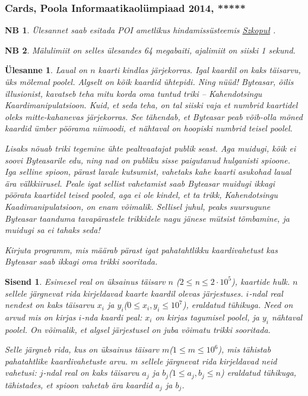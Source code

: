 \documentclass{trkut}
\newtheorem*{extra}{NB}
\newtheorem*{Input}{Sisend}
\newtheorem*{Text}{Ülesanne}
\begin{document}
\subsubsection{Cards, Poola Informaatikaolümpiaad 2014, *****}
\begin{extra}
Ülesannet saab esitada POI ametlikus hindamissüsteemis \href{https://szkopul.edu.pl/problemset/problem/qpsk3ygf8MU7D_1Es0oc_xd8/site/?key=statement}{Szkopuł} .
\end{extra}
\begin{extra}
Mälulimiit on selles ülesandes 64 megabaiti, ajalimiit on siiski 1 sekund.
\end{extra}
\begin{Text}
Laual on $n$ kaarti kindlas järjekorras. Igal kaardil on kaks täisarvu, üks mõlemal poolel.
Algselt on kõik kaardid ühtepidi. Ning nüüd! Byteasar,  õilis illusionist, kavatseb teha mitu korda oma tuntud triki -- Kahendotsingu Kaardimanipulatsioon. 
Kuid, et seda teha, on tal siiski vaja et numbrid kaartidel oleks mitte-kahanevas järjekorras. See tähendab, et Byteasar peab võib-olla mõned kaardid ümber pöörama niimoodi, et nähtaval on hoopiski numbrid teisel poolel.

Lisaks nõuab triki tegemine ühte pealtvaatajat publik seast. Aga muidugi, kõik ei soovi Byteasarile edu, ning nad on publiku sisse paigutanud hulganisti spioone. 
Iga selline spioon, pärast lavale kutsumist, vahetaks kahe kaarti asukohad laual ära välkkiirusel. Peale igat sellist vahetamist saab Byteasar muidugi ikkagi pöörata kaartidel teised pooled, aga ei ole kindel, et ta trikk, Kahendotsingu Kaadimanipulatsioon, on enam võimalik. Sellisel juhul, peaks suursugune Byteasar taanduma tavapärastele trikkidele nagu jänese mütsist tõmbamine, ja muidugi sa ei tahaks seda!

Kirjuta programm, mis määrab pärast igat pahatahtlikku kaardivahetust kas Byteasar saab ikkagi oma trikki sooritada.

\parencite{12}
\end{Text}
\begin{Input}
Esimesel real on üksainus täisarv $n$ ($2\le $n$\le 2\cdot 10^5$), kaartide hulk. 
$n$ sellele järgnevat rida kirjeldavad kaarte kaardil olevas järjestuses. $i$-ndal real nendest on kaks täisarvu $x_i$ ja $y_i$($0\le x_i, y_i\le 10^7$), eraldatud tühikuga. Need on arvud mis on kirjas $i$-nda kaardi peal: $x_i$ on kirjas tagumisel poolel, ja $y_i$ nähtaval poolel.
On võimalik, et algsel järjestusel on juba võimatu trikki sooritada.

Selle järgneb rida, kus on üksainus täisarv $m$($1\le m\le 10^6$), mis tähistab pahatahtlike kaardivahetuste arvu. $m$ sellele järgnevat rida kirjeldavad neid vahetusi: $j$-ndal real on kaks täisarvu $a_j$ ja $b_j$($1\le a_j, b_j\le n$) eraldatud tühikuga, tähistades, et spioon vahetab ära kaardid $a_j$ ja $b_j$.
\end{Input}
\end{document}
